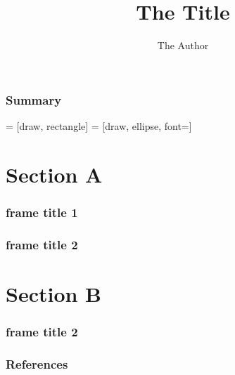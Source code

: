 \documentclass{beamer}
\title{The Title}
\author{The Author}
\institute{}
\date{}
\begin{document}
\begin{CJK*}{UTF8}{gbsn}

\frame{\titlepage}


\begin{frame}
    \frametitle{Summary}

     = [draw, rectangle]
     = [draw, ellipse, font=\tiny]


\end{frame}


\section{Section A}

\begin{frame}
\frametitle{frame title 1}

\begin{definition}[definition 1]
\end{definition}

\end{frame}


\begin{frame}
\frametitle{frame title 2}

\end{frame}


\section{Section B}

\begin{frame}
\frametitle{frame title 2}

\end{frame}


\begin{frame}[allowframebreaks]
    \frametitle{References}
    
    \tiny
\end{frame}

\end{CJK*}
\end{document}
